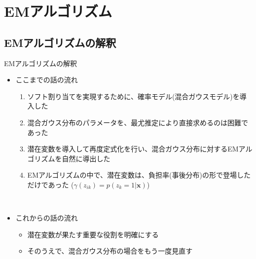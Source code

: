 \documentclass[dvipdfmx,notheorems,t]{beamer}
\begin{document}
\section{EMアルゴリズム}

\subsection{EMアルゴリズムの解釈}

\begin{frame}{EMアルゴリズムの解釈}

\begin{itemize}
	\item ここまでの話の流れ
	\begin{enumerate}
		\item \alert{ソフト割り当て}を実現するために、確率モデル(混合ガウスモデル)を導入した
		\newline
		\item 混合ガウス分布のパラメータを、最尤推定により直接求めるのは困難であった
		\newline
		\item \alert{潜在変数}を導入して再度定式化を行い、混合ガウス分布に対する\alert{EMアルゴリズム}を自然に導出した
		\newline
		\item EMアルゴリズムの中で、潜在変数は、\alert{負担率}(事後分布)の形で登場しただけであった ($\gamma(z_{ik}) = p(z_k = 1 | \bm{x})$)
	\end{enumerate} \
	
	\item これからの話の流れ
	\begin{itemize}
		\item 潜在変数が果たす重要な役割を明確にする
		\item そのうえで、混合ガウス分布の場合をもう一度見直す
	\end{itemize}
\end{itemize}

\end{frame}
\end{document}
